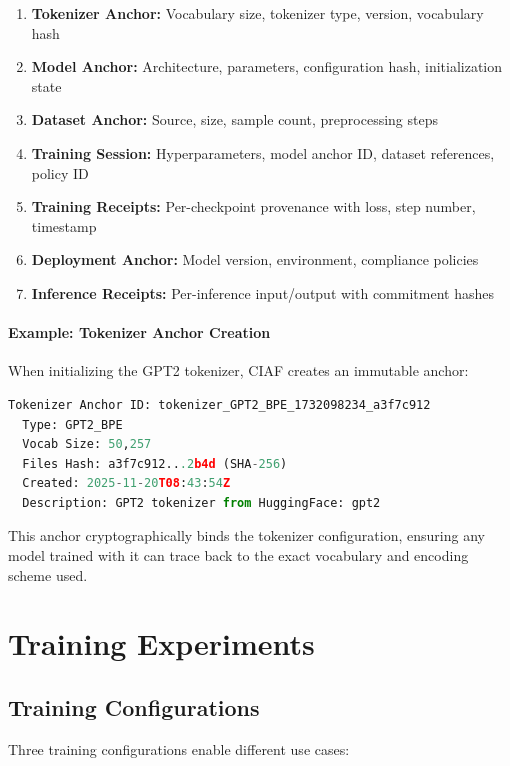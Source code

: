 \documentclass[11pt,a4paper]{article}
\begin{document}
\begin{enumerate}
    \item \textbf{Tokenizer Anchor:} Vocabulary size, tokenizer type, version, vocabulary hash
    \item \textbf{Model Anchor:} Architecture, parameters, configuration hash, initialization state
    \item \textbf{Dataset Anchor:} Source, size, sample count, preprocessing steps
    \item \textbf{Training Session:} Hyperparameters, model anchor ID, dataset references, policy ID
    \item \textbf{Training Receipts:} Per-checkpoint provenance with loss, step number, timestamp
    \item \textbf{Deployment Anchor:} Model version, environment, compliance policies
    \item \textbf{Inference Receipts:} Per-inference input/output with commitment hashes
\end{enumerate}

\paragraph{Example: Tokenizer Anchor Creation}
When initializing the GPT2 tokenizer, CIAF creates an immutable anchor:

\begin{lstlisting}[language=Python, basicstyle=\small\ttfamily, breaklines=true]
Tokenizer Anchor ID: tokenizer_GPT2_BPE_1732098234_a3f7c912
  Type: GPT2_BPE
  Vocab Size: 50,257
  Files Hash: a3f7c912...2b4d (SHA-256)
  Created: 2025-11-20T08:43:54Z
  Description: GPT2 tokenizer from HuggingFace: gpt2
\end{lstlisting}

This anchor cryptographically binds the tokenizer configuration, ensuring any model trained with it can trace back to the exact vocabulary and encoding scheme used.

\section{Training Experiments}

\subsection{Training Configurations}
Three training configurations enable different use cases:
\end{document}
